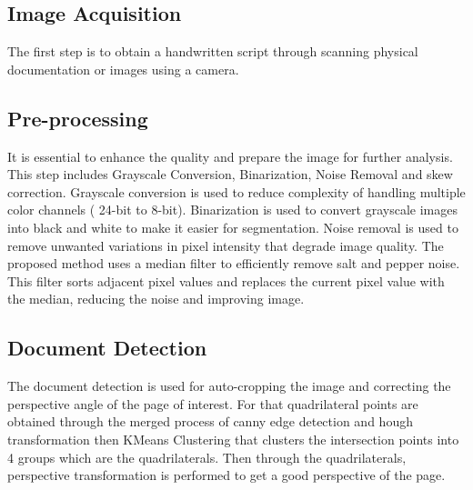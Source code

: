 \subsection{Image Acquisition}
The first step is to obtain a handwritten script through  scanning physical documentation or images using a camera.
\subsection{Pre-processing}
It is essential to enhance the quality and prepare the image for further analysis. This step includes Grayscale Conversion, Binarization, Noise Removal and skew correction. Grayscale conversion is used to reduce complexity of handling multiple color channels ( 24-bit to 8-bit). Binarization is used to convert grayscale images into black and white to make it easier for segmentation.\newline
Noise removal is used to remove unwanted variations in pixel intensity that degrade image quality. The proposed method uses a median filter to efficiently remove salt and pepper noise. This filter sorts adjacent pixel values and replaces the current pixel value with the median, reducing the noise and improving image.
\subsection{Document Detection}
The document detection is used for auto-cropping the image and correcting the perspective angle of the page of interest. For that quadrilateral points are obtained through the merged process of canny edge detection and hough transformation then KMeans Clustering that clusters the intersection points into 4 groups which are the quadrilaterals. Then through the quadrilaterals, perspective transformation is performed to get a good perspective of the page\cite{Ishfar2020DocumentDetection}.
